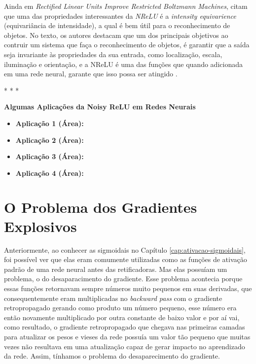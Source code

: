 Ainda em \textit{Rectified Linear Units Improve Restricted Boltzmann Machines}, \textcite{Nair2010} citam que uma das propriedades interessantes da \textit{NReLU} é a \textit{intensity equivarience} (equivariância de intensidade), a qual é bem útil para o reconhecimento de objetos. No texto, os autores destacam que um dos principais objetivos ao contruir um sistema que faça o reconhecimento de objetos, é garantir que a saída seja invariante às propriedades da sua entrada, como localização, escala, iluminação e orientação, e a NReLU é uma das funções que quando adicionada em uma rede neural, garante que isso possa ser atingido \parencite{Nair2010}.

\medskip
\begin{center}
 * * *
\end{center}
\medskip

\textbf{Algumas Aplicações da Noisy ReLU em Redes Neurais}
\vspace{1em}

\begin{itemize}
    \item \textbf{Aplicação 1 (Área):}
    \item \textbf{Aplicação 2 (Área):}
    \item \textbf{Aplicação 3 (Área):}
    \item \textbf{Aplicação 4 (Área):}
\end{itemize}

\section{O Problema dos Gradientes Explosivos}

Anteriormente, ao conhecer as sigmoidais no Capítulo \ref{cap:ativacao-sigmoidais}, foi possível ver que elas eram comumente utilizadas como as funções de ativação padrão de uma rede neural antes das retificadoras. Mas elas possuíam um problema, o do desaparacimento do gradiente. Esse problema acontecia porque essas funções retornavam sempre números muito pequenos em suas derivadas, que consequentemente eram multiplicadas no \textit{backward pass} com o gradiente retropropagado gerando como produto um número pequeno, esse número era então novamente multiplicado por outra constante de baixo valor e por aí vai, como resultado, o gradiente retropropagado que chegava nas primeiras camadas para atualizar os pesos e vieses da rede possuía um valor tão pequeno que muitas vezes não resultava em uma atualização capaz de gerar impacto no aprendizado da rede. Assim, tínhamos o problema do desaparecimento do gradiente.

